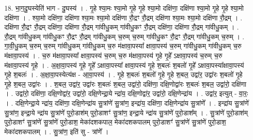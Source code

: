 \documentclass[17pt]{extarticle}
\begin{document}
18. भा॒ग॒दु॒घस्येति॑ भाग - दु॒घस्य॑ । . गृ॒हे श्या॒मः श्या॒मो गृ॒हे गृ॒हे श्या॒मो दक्षि॑णा॒ दक्षि॑णा श्या॒मो गृ॒हे गृ॒हे श्या॒मो दक्षि॑णा । . श्या॒मो दक्षि॑णा॒ दक्षि॑णा श्या॒मः श्या॒मो दक्षि॑णा रौ॒द्रꣳ रौ॒द्रम् दक्षि॑णा श्या॒मः श्या॒मो दक्षि॑णा रौ॒द्रम् । . दक्षि॑णा रौ॒द्रꣳ रौ॒द्रम् दक्षि॑णा॒ दक्षि॑णा रौ॒द्रम् गा॑वीधु॒कम् गा॑वीधु॒कꣳ रौ॒द्रम् दक्षि॑णा॒ दक्षि॑णा रौ॒द्रम् गा॑वीधु॒कम् । . रौ॒द्रम् गा॑वीधु॒कम् गा॑वीधु॒कꣳ रौ॒द्रꣳ रौ॒द्रम् गा॑वीधु॒कम् च॒रुम् च॒रुम् गा॑वीधु॒कꣳ रौ॒द्रꣳ रौ॒द्रम् गा॑वीधु॒कम् च॒रुम् । . गा॒वी॒धु॒कम् च॒रुम् च॒रुम् गा॑वीधु॒कम् गा॑वीधु॒कम् च॒रु म॑क्षावा॒पस्या᳚ क्षावा॒पस्य॑ च॒रुम् गा॑वीधु॒कम् गा॑वीधु॒कम् च॒रु म॑क्षावा॒पस्य॑ । . च॒रु म॑क्षावा॒पस्या᳚ क्षावा॒पस्य॑ च॒रुम् च॒रु म॑क्षावा॒पस्य॑ गृ॒हे गृ॒हे᳚ ऽक्षावा॒पस्य॑ च॒रुम् च॒रु म॑क्षावा॒पस्य॑ गृ॒हे । . अ॒क्षा॒वा॒पस्य॑ गृ॒हे गृ॒हे᳚ ऽक्षावा॒पस्या᳚ क्षावा॒पस्य॑ गृ॒हे श॒बलः॑ श॒बलो॑ गृ॒हे᳚ ऽक्षावा॒पस्या᳚क्षावा॒पस्य॑ गृ॒हे श॒बलः॑ । . अ॒क्षा॒वा॒पस्येत्य॑क्ष - आ॒वा॒पस्य॑ । . गृ॒हे श॒बलः॑ श॒बलो॑ गृ॒हे गृ॒हे श॒बल॒ उद्वा॑र॒ उद्वा॑रः श॒बलो॑ गृ॒हे गृ॒हे श॒बल॒ उद्वा॑रः । . श॒बल॒ उद्वा॑र॒ उद्वा॑रः श॒बलः॑ श॒बल॒ उद्वा॑रो॒ दक्षि॑णा॒ दक्षि॒णोद्वा॑रः श॒बलः॑ श॒बल॒ उद्वा॑रो॒ दक्षि॑णा । . उद्वा॑रो॒ दक्षि॑णा॒ दक्षि॒णोद्वा॑र॒ उद्वा॑रो॒ दक्षि॒णेन्द्रा॒ये न्द्रा॑य॒ दक्षि॒णोद्वा॑र॒ उद्वा॑रो॒ दक्षि॒णेन्द्रा॑य । . उद्वा॑र॒ इत्युत् - वा॒रः॒ । . दक्षि॒णेन्द्रा॒ये न्द्रा॑य॒ दक्षि॑णा॒ दक्षि॒णेन्द्रा॑य सु॒त्रांणे॑ सु॒त्रांण॒ इन्द्रा॑य॒ दक्षि॑णा॒ दक्षि॒णेन्द्रा॑य सु॒त्रांणे᳚ । . इन्द्रा॑य सु॒त्रांणे॑ सु॒त्रांण॒ इन्द्रा॒ये न्द्रा॑य सु॒त्रांणे॑ पुरो॒डाश॑म् पुरो॒डाशꣳ॑ सु॒त्रांण॒ इन्द्रा॒ये न्द्रा॑य सु॒त्रांणे॑ पुरो॒डाश᳚म् । . सु॒त्रांणे॑ पुरो॒डाश॑म् पुरो॒डाशꣳ॑ सु॒त्रांणे॑ सु॒त्रांणे॑ पुरो॒डाश॒ मेका॑दशकपाल॒ मेका॑दशकपालम् पुरो॒डाशꣳ॑ सु॒त्रांणे॑ सु॒त्रांणे॑ पुरो॒डाश॒ मेका॑दशकपालम् । . सु॒त्रांण॒ इति॑ सु - त्रांणे᳚ । \newline
\end{document}
